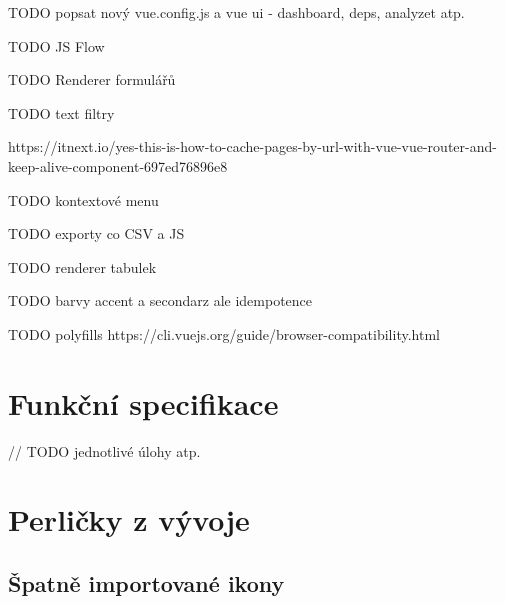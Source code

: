 

TODO popsat nový vue.config.js a vue ui - dashboard, deps, analyzet atp.

TODO JS Flow

TODO Renderer formulářů

TODO text filtry

https://itnext.io/yes-this-is-how-to-cache-pages-by-url-with-vue-vue-router-and-keep-alive-component-697ed76896e8

TODO kontextové menu

TODO exporty co CSV a JS

TODO renderer tabulek

TODO barvy accent a secondarz ale idempotence

TODO polyfills https://cli.vuejs.org/guide/browser-compatibility.html


\section{Funkční specifikace}

// TODO jednotlivé úlohy atp.


\section{Perličky z vývoje}

\subsection{Špatně importované ikony}

